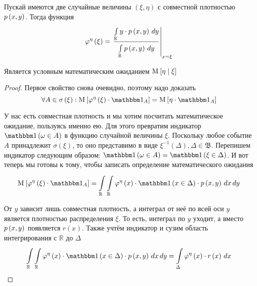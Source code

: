 \begin{lemma}
    Пускай имеются две случайные величины $\left( \xi, \eta \right)$
    с совместной плотностью $\pdf{x,y}$.
    Тогда функция
    $$\varphi^{\eta}\left( \xi \right)
        = \left. \frac{\integral{\mathbb{R}}{}{y}{y \cdot \pdf{x,y}}}
            {\integral{\mathbb{R}}{}{y}{\pdf{x,y}}} \right|_{x=\xi}$$

    Является условным математическим ожиданием
    $\Mean{ \eta \mid \xi }$

\end{lemma}
\begin{proof}
Первое свойство снова очевидно, поэтому надо доказать
\begin{equation}\label{conditionalExpectationContinualStart}
    \forall A \in \sigma\left( \xi \right):
        \Mean{\varphi^{\eta}\left( \xi \right) \cdot \indicatorof{A}}
            = \Mean{ \eta \cdot \indicatorof{A} }
\end{equation}

У нас есть совместная плотность и мы хотим посчитать математическое ожидание,
пользуясь именно ею.
Для этого превратим индикатор $\indicator{\omega \in A}$
в функцию случайной величины $\xi$.
Поскольку любое событие $A$ принадлежит $\sigma\left( \xi \right)$,
то оно представимо в виде
$\xi^{-1}\left( \Delta \right), \Delta \in \mathfrak{B}$.
Перепишем индикатор следующим образом:
$\indicator{\omega \in A} = \indicator{\xi \in \Delta}$.
И вот теперь мы готовы к тому,
чтобы записать определение математического ожидания
$$\Mean{ \varphi^{\eta}\left( \xi \right) \cdot \indicatorof{A} }
    = \integral{\mathbb{R}}{}{y}{ \integral{\mathbb{R}}{}{x}{
        \varphi^{\eta}\left( x \right) \cdot \indicator{x \in \Delta}
            \cdot \pdf{x,y}}}$$

От $y$ зависит лишь совместная плотность, а интеграл от неё по всей оси $y$
является плотностью распределения $\xi$.
То есть, интеграл по $y$ уходит,
а вместо $\pdf{x,y}$ появляется $r\left( x \right)$.
Также учтём индикатор и сузим область интегрирования с $\mathbb{R}$ до $\Delta$
$$\integral{\mathbb{R}}{}{y}{ \integral{\mathbb{R}}{}{x}{
    \varphi^{\eta}\left( x \right) \cdot \indicator{x \in \Delta}
        \cdot \pdf{x,y}}}
    = \integral{\Delta}{}{x}{
        \varphi^{\eta}\left( x \right) \cdot r\left( x \right)}$$


\end{proof}
